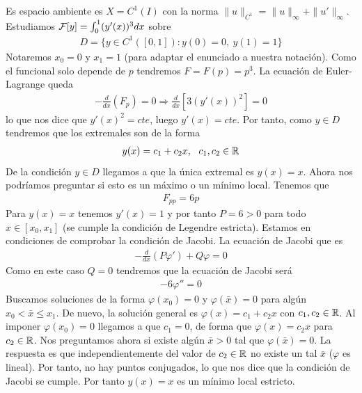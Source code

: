 \begin{ejemplo}
    Es espacio ambiente es $X=C^1(I)$ con la norma $\|u\|_{C^1} = \|u\|_\infty + \|u'\|_\infty$. Estudiamos $\mathcal{F}[y] = \int_0^1 (y'(x))^3dx$ sobre
    \begin{gather*}
        D=\{y\in C^1([0,1]) : y(0)=0,\ y(1)=1\}
    \end{gather*}
    Notaremos $x_0=0$ y $x_1=1$ (para adaptar el enunciado a nuestra notación). Como el funcional solo depende de $p$ tendremos $F=F(p)=p^3$. La ecuación de Euler-Lagrange queda
    \begin{gather*}
        -\frac{d}{dx}(F_p) = 0 \Rightarrow \frac{d}{dx} [3(y'(x))^2] = 0
    \end{gather*}
    lo que nos dice que $y'(x)^2 = cte$, luego $y'(x)=cte$. Por tanto, como $y\in D$ tendremos que los extremales son de la forma
    \begin{gather*}
        y(x)=c_1 + c_2x,\ \ c_1,c_2\in \mathbb{R}
    \end{gather*}
    De la condición $y\in D$ llegamos a que la única extremal es $y(x)=x$. Ahora nos podríamos preguntar si esto es un máximo o un mínimo local. Tenemos que 
    \begin{gather*}
        F_{pp} = 6p
    \end{gather*}
    Para $y(x)=x$ tenemos $y'(x)=1$ y por tanto $P=6>0$ para todo $x\in [x_0, x_1]$ (se cumple la condición de Legendre estricta). Estamos en condiciones de comprobar la condición de Jacobi. La ecuación de Jacobi que es
    \begin{gather*}
        -\frac{d}{dx}(P\varphi') + Q\varphi = 0
    \end{gather*}
    Como en este caso $Q=0$ tendremos que la ecuación de Jacobi será
    \begin{gather*}
        -6\varphi''=0
    \end{gather*}
    Buscamos soluciones de la forma $\varphi(x_0)=0$ y $\varphi(\bar{x})=0$ para algún $x_0<\bar{x}\leq x_1$. De nuevo, la solución general es $\varphi(x)=c_1+c_2x$ con $c_1,c_2\in \mathbb{R}$. Al imponer $\varphi(x_0)=0$ llegamos a que $c_1=0$, de forma que $\varphi(x)=c_2x$ para $c_2\in \mathbb{R}$. Nos preguntamos ahora si existe algún $\bar{x}>0$ tal que $\varphi(\bar{x})=0$. La respuesta es que independientemente del valor de $c_2\in \mathbb{R}$ no existe un tal $\bar{x}$ ($\varphi$ es lineal). Por tanto, no hay puntos conjugados, lo que nos dice que la condición de Jacobi se cumple. Por tanto $y(x)=x$ es un mínimo local estricto.
\end{ejemplo}

